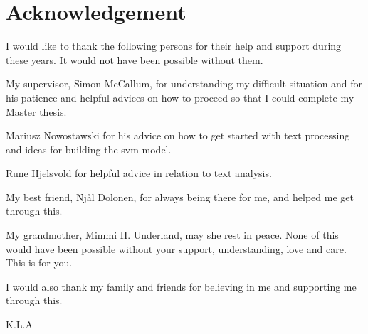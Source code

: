 \chapter*{Acknowledgement}
I would like to thank the following persons for their help and support during these years. It would not have been possible without them.

My supervisor, Simon McCallum, for understanding my difficult situation and for his patience and helpful advices on how to proceed so that I could complete my Master thesis.

Mariusz Nowostawski for his advice on how to get started with text processing and ideas for building the \gls{svm} model. 

Rune Hjelsvold for helpful advice in relation to text analysis.

My best friend, Njål Dolonen, for always being there for me, and helped me get through this.

My grandmother, Mimmi H. Underland, may she rest in peace. None of this would have been possible without your support, understanding, love and care. This is for you.

I would also thank my family and friends for believing in me and supporting me through this.

\begin{flushright}
K.L.A
\end{flushright}